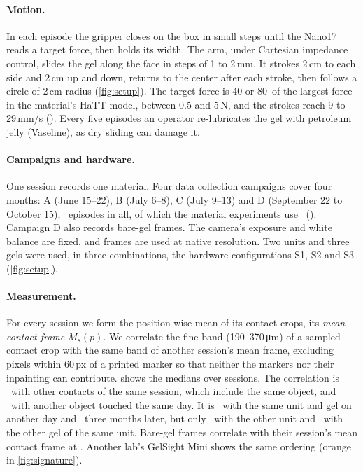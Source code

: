 \paragraph{Motion.}
In each episode the gripper closes on the box in small steps until the Nano17 reads a target force, then holds its width. The arm, under Cartesian impedance control, slides the gel along the face in steps of 1 to 2\,mm. It strokes 2\,cm to each side and 2\,cm up and down, returns to the center after each stroke, then follows a circle of 2\,cm radius (\cref{fig:setup}). The target force is 40 or 80\pct\ of the largest force in the material's HaTT model, between 0.5 and 5\,N, and the strokes reach 9 to 29\,mm/s (). Every five episodes an operator re-lubricates the gel with petroleum jelly (Vaseline), as dry sliding can damage it.

\paragraph{Campaigns and hardware.}
One session records one material. Four data collection campaigns cover four months: A (June 15--22), B (July 6--8), C (July 9--13) and D (September 22 to October 15), \EpRecorded\ episodes in all, of which the material experiments use \EpCrops\ (). Campaign D also records bare-gel frames. The camera's exposure and white balance are fixed, and frames are used at native resolution. Two units and three gels were used, in three combinations, the hardware configurations S1, S2 and S3 (\cref{fig:setup}).

\paragraph{Measurement.}
For every session we form the position-wise mean of its contact crops, its \emph{mean contact frame} $M_s(p)$. We correlate the fine band (190--370\,\si{\micro\metre}) of a sampled contact crop with the same band of another session's mean frame, excluding pixels within 60\,px of a printed marker so that neither the markers nor their inpainting can contribute.  shows the medians over sessions. The correlation is \HwFarOwn\ with other contacts of the same session, which include the same object, and \HwFarSameDay\ with another object touched the same day. It is \HwFarWeeks\ with the same unit and gel on another day and \HwFarMonths\ three months later, but only \HwFarOtherUnit\ with the other unit and \HwFarOtherGel\ with the other gel of the same unit. Bare-gel frames correlate with their session's mean contact frame at \BlankVsFieldFar. Another lab's GelSight Mini shows the same ordering (orange in \cref{fig:signature}).

